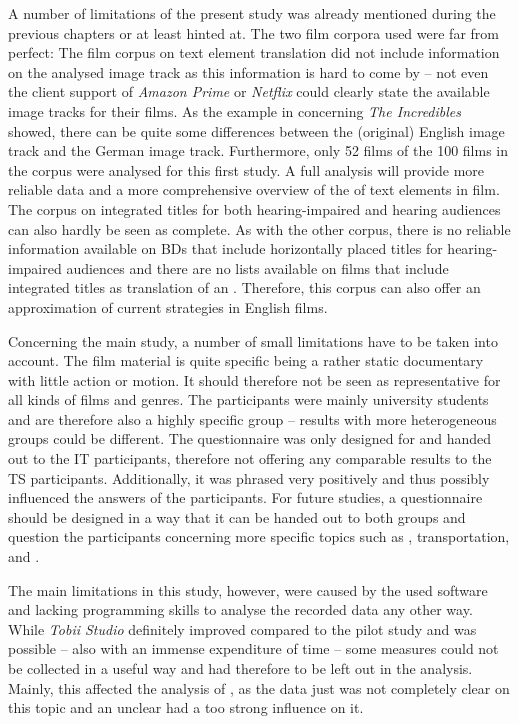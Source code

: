 A number of limitations of the present study was already mentioned during the previous chapters or at least hinted at. The two film corpora used were far from perfect: The film corpus on text element translation did not include information on the analysed image track as this information is hard to come by – not even the client support of \textit{Amazon Prime} or \textit{Netflix} could clearly state the available image tracks for their films. As the example in  concerning \textit{The Incredibles} showed, there can be quite some differences between the (original) English image track and the German image track. Furthermore, only 52 films of the 100 films in the corpus were analysed for this first study. A full analysis will provide more reliable data and a more comprehensive overview of the  of text elements in film. The corpus on integrated titles for both hearing-impaired and hearing audiences can also hardly be seen as complete. As with the other corpus, there is no reliable information available on BDs that include horizontally placed titles for hearing-impaired audiences and there are no lists available on films that include integrated titles as translation of an . Therefore, this corpus can also offer an approximation of current  strategies in English films.



Concerning the main study, a number of small limitations have to be taken into account. The film material is quite specific being a rather static documentary with little action or motion. It should therefore not be seen as representative for all kinds of films and genres. The participants were mainly university students and are therefore also a highly specific group – results with more heterogeneous groups could be different. The questionnaire was only designed for and handed out to the IT participants, therefore not offering any comparable results to the TS participants. Additionally, it was phrased very positively and thus possibly influenced the answers of the participants. For future studies, a questionnaire should be designed in a way that it can be handed out to both groups and question the participants concerning more specific topics such as , transportation, and .


\newpage 
The main limitations in this study, however, were caused by the used software and lacking programming skills to analyse the recorded  data any other way. While \textit{Tobii Studio} definitely improved compared to the pilot study and  was possible – also with an immense expenditure of time – some measures could not be collected in a useful way and had therefore to be left out in the analysis. Mainly, this affected the analysis of , as the data just was not completely clear on this topic and an unclear  had a too strong influence on it.



